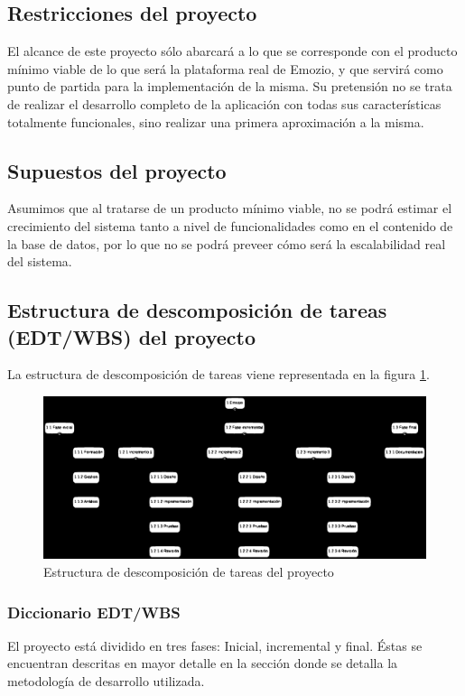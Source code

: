 \subsection{Restricciones del proyecto}
El alcance de este proyecto sólo abarcará a lo que se corresponde con el producto mínimo viable de lo que será la plataforma real de Emozio, y que servirá como punto de partida para la implementación de la misma. Su pretensión no se trata de realizar el desarrollo completo de la aplicación con todas sus características totalmente funcionales, sino realizar una primera aproximación a la misma.

\subsection{Supuestos del proyecto}
Asumimos que al tratarse de un producto mínimo viable, no se podrá estimar el crecimiento del sistema tanto a nivel de funcionalidades como en el contenido de la base de datos, por lo que no se podrá preveer cómo será la escalabilidad real del sistema.

\subsection{Estructura de descomposición de tareas (EDT/WBS) del proyecto}
La estructura de descomposición de tareas viene representada en la figura \ref{fig:edt}.

\begin{figure}[htbp] 
    \centering
    \includegraphics[width=1\textwidth]{figuras/edt.eps}
    \caption{Estructura de descomposición de tareas del proyecto}
    \label{fig:edt}
\end{figure}	

\subsubsection{Diccionario EDT/WBS}
El proyecto está dividido en tres fases: Inicial, incremental y final. Éstas se encuentran descritas en mayor detalle en la sección donde se detalla la metodología de desarrollo utilizada.

